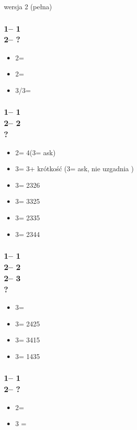 \documentclass[12pt, a4paper]{report}
\begin{document}
{    {\large wersja 2 (pełna)}
    \subsubsection*{1\clubs -- 1\hearts\\
                    2\hearts -- ?}
    \begin{itemize}
        \item 2\spades = \gf
        \item 2\nt = \inv\ \spades
        \item 3\minor/3\hearts = \inv
    \end{itemize}

    \subsubsection*{1\clubs -- 1\hearts\\
                    2\hearts -- 2\spades\\
                    ?}
    \begin{itemize}
        \item 2\nt = 4\hearts (3\clubs = ask)
        \item 3\clubs = 3\hearts + krótkość (3\diams = ask, nie uzgadnia \hearts)
        \item 3\diams = 2326
        \item 3\hearts = 3325
        \item 3\spades = 2335
        \item 3\nt = 2344
    \end{itemize}

    \subsubsection*{1\clubs -- 1\hearts\\
                    2\hearts -- 2\spades\\
                    2\nt -- 3\clubs\\
                    ?}
    \begin{itemize}
        \item 3\diams = \bal
        \item 3\hearts = 2425
        \item 3\spades = 3415
        \item 3\nt = 1435
    \end{itemize}

    \subsubsection*{1\clubs -- 1\spades\\
                    2\spades -- ?}
    \begin{itemize}
        \item 2\nt = \gf
        \item 3 = \inv
    \end{itemize}

}
\end{document}
